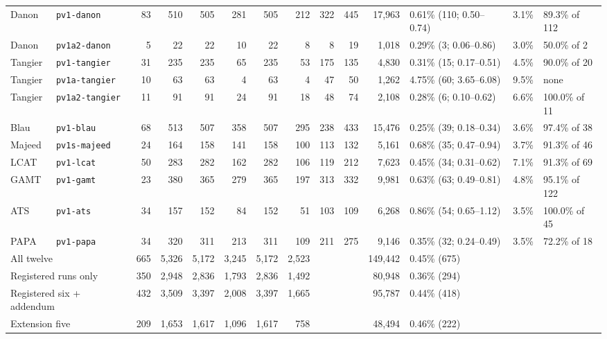 \documentclass{article} %
\begin{document}
\begin{table}[h]
\begin{center}
{\begin{tabular}{llrrrrrrrrrlll}
Danon & \texttt{pv1-danon} & 83 & 510 & 505 & 281 & 505 & 212 & 322 & 445 & 17,963 & 0.61\% (110; 0.50--0.74) & 3.1\% & 89.3\% of 112 \\
Danon & \texttt{pv1a2-danon} & 5 & 22 & 22 & 10 & 22 & 8 & 8 & 19 & 1,018 & 0.29\% (3; 0.06--0.86) & 3.0\% & 50.0\% of 2 \\
Tangier & \texttt{pv1-tangier} & 31 & 235 & 235 & 65 & 235 & 53 & 175 & 135 & 4,830 & 0.31\% (15; 0.17--0.51) & 4.5\% & 90.0\% of 20 \\
Tangier & \texttt{pv1a-tangier} & 10 & 63 & 63 & 4 & 63 & 4 & 47 & 50 & 1,262 & 4.75\% (60; 3.65--6.08) & 9.5\% & none \\
Tangier & \texttt{pv1a2-tangier} & 11 & 91 & 91 & 24 & 91 & 18 & 48 & 74 & 2,108 & 0.28\% (6; 0.10--0.62) & 6.6\% & 100.0\% of 11 \\
Blau & \texttt{pv1-blau} & 68 & 513 & 507 & 358 & 507 & 295 & 238 & 433 & 15,476 & 0.25\% (39; 0.18--0.34) & 3.6\% & 97.4\% of 38 \\
Majeed & \texttt{pv1s-majeed} & 24 & 164 & 158 & 141 & 158 & 100 & 113 & 132 & 5,161 & 0.68\% (35; 0.47--0.94) & 3.7\% & 91.3\% of 46 \\
LCAT & \texttt{pv1-lcat} & 50 & 283 & 282 & 162 & 282 & 106 & 119 & 212 & 7,623 & 0.45\% (34; 0.31--0.62) & 7.1\% & 91.3\% of 69 \\
GAMT & \texttt{pv1-gamt} & 23 & 380 & 365 & 279 & 365 & 197 & 313 & 332 & 9,981 & 0.63\% (63; 0.49--0.81) & 4.8\% & 95.1\% of 122 \\
ATS & \texttt{pv1-ats} & 34 & 157 & 152 & 84 & 152 & 51 & 103 & 109 & 6,268 & 0.86\% (54; 0.65--1.12) & 3.5\% & 100.0\% of 45 \\
PAPA & \texttt{pv1-papa} & 34 & 320 & 311 & 213 & 311 & 109 & 211 & 275 & 9,146 & 0.35\% (32; 0.24--0.49) & 3.5\% & 72.2\% of 18 \\
\midrule
\multicolumn{2}{l}{All twelve} & 665 & 5,326 & 5,172 & 3,245 & 5,172 & 2,523 & & & 149,442 & 0.45\% (675) & & \\
\multicolumn{2}{l}{Registered runs only} & 350 & 2,948 & 2,836 & 1,793 & 2,836 & 1,492 & & & 80,948 & 0.36\% (294) & & \\
\multicolumn{2}{l}{Registered six + addendum} & 432 & 3,509 & 3,397 & 2,008 & 3,397 & 1,665 & & & 95,787 & 0.44\% (418) & & \\
\multicolumn{2}{l}{Extension five} & 209 & 1,653 & 1,617 & 1,096 & 1,617 & 758 & & & 48,494 & 0.46\% (222) & & \\
\bottomrule
\end{tabular}}
\end{center}
\end{table}
\end{document}
